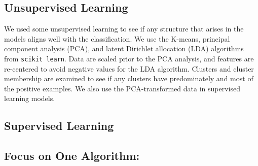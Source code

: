 \subsection{Unsupervised Learning}
We used some unsupervised learning to see if any structure that arises in the models aligns well with the classification.  We use the K-means, principal component analysis (PCA), and latent Dirichlet allocation (LDA) algorithms from \texttt{scikit learn}\cite{scikit-learn}.  Data are scaled prior to the PCA analysis, and features are re-centered to avoid negative values for the LDA algorithm.  Clusters and cluster membership are examined to see if any clusters have predominately and most of the positive examples. We also use the PCA-transformed data in supervised learning models.




\subsection{Supervised Learning}






\subsection{Focus on One Algorithm: }